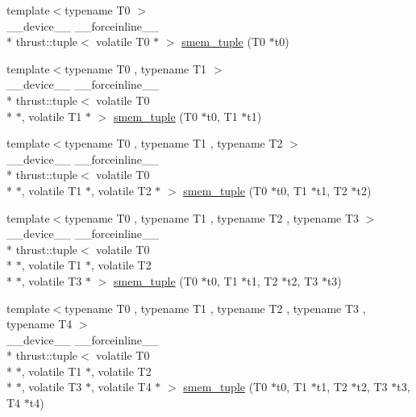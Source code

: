 \begin{DoxyCompactItemize}
\item 
{\footnotesize template$<$typename T0 $>$ }\\\-\_\-\-\_\-device\-\_\-\-\_\- \-\_\-\-\_\-forceinline\-\_\-\-\_\- \\*
thrust\-::tuple$<$ volatile T0 $\ast$ $>$ \hyperlink{namespacecv_1_1gpu_1_1device_a4d9ad7c3939d732889bb1e23c73a724e}{smem\-\_\-tuple} (T0 $\ast$t0)
\item 
{\footnotesize template$<$typename T0 , typename T1 $>$ }\\\-\_\-\-\_\-device\-\_\-\-\_\- \-\_\-\-\_\-forceinline\-\_\-\-\_\- \\*
thrust\-::tuple$<$ volatile T0 \\*
$\ast$, volatile T1 $\ast$ $>$ \hyperlink{namespacecv_1_1gpu_1_1device_a3326ea114da45330f3e02906ba29cc55}{smem\-\_\-tuple} (T0 $\ast$t0, T1 $\ast$t1)
\item 
{\footnotesize template$<$typename T0 , typename T1 , typename T2 $>$ }\\\-\_\-\-\_\-device\-\_\-\-\_\- \-\_\-\-\_\-forceinline\-\_\-\-\_\- \\*
thrust\-::tuple$<$ volatile T0 \\*
$\ast$, volatile T1 $\ast$, volatile T2 $\ast$ $>$ \hyperlink{namespacecv_1_1gpu_1_1device_a3135456d340f045475ceb16697be4797}{smem\-\_\-tuple} (T0 $\ast$t0, T1 $\ast$t1, T2 $\ast$t2)
\item 
{\footnotesize template$<$typename T0 , typename T1 , typename T2 , typename T3 $>$ }\\\-\_\-\-\_\-device\-\_\-\-\_\- \-\_\-\-\_\-forceinline\-\_\-\-\_\- \\*
thrust\-::tuple$<$ volatile T0 \\*
$\ast$, volatile T1 $\ast$, volatile T2 \\*
$\ast$, volatile T3 $\ast$ $>$ \hyperlink{namespacecv_1_1gpu_1_1device_af2e6d9bd1e084d3cbf589a90fcdf790e}{smem\-\_\-tuple} (T0 $\ast$t0, T1 $\ast$t1, T2 $\ast$t2, T3 $\ast$t3)
\item 
{\footnotesize template$<$typename T0 , typename T1 , typename T2 , typename T3 , typename T4 $>$ }\\\-\_\-\-\_\-device\-\_\-\-\_\- \-\_\-\-\_\-forceinline\-\_\-\-\_\- \\*
thrust\-::tuple$<$ volatile T0 \\*
$\ast$, volatile T1 $\ast$, volatile T2 \\*
$\ast$, volatile T3 $\ast$, volatile T4 $\ast$ $>$ \hyperlink{namespacecv_1_1gpu_1_1device_a39b14e522cb1e78698f0efb5d80bd97b}{smem\-\_\-tuple} (T0 $\ast$t0, T1 $\ast$t1, T2 $\ast$t2, T3 $\ast$t3, T4 $\ast$t4)

\end{DoxyCompactItemize}

